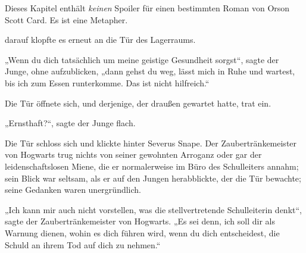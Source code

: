 
\begin{chapterOpeningAuthorNote}
Dieses Kapitel enthält \emph{keinen} Spoiler für einen bestimmten Roman von Orson Scott Card. Es ist eine Metapher.
\end{chapterOpeningAuthorNote}

 darauf klopfte es erneut an die Tür des Lagerraums.

\hplettrineextrapara
„Wenn du dich tatsächlich um meine geistige Gesundheit sorgst“, sagte der Junge, ohne aufzublicken, „dann gehst du weg, lässt mich in Ruhe und wartest, bis ich zum Essen runterkomme. Das ist nicht hilfreich.“

Die Tür öffnete sich, und derjenige, der draußen gewartet hatte, trat ein.

„Ernsthaft?“, sagte der Junge flach.


Die Tür schloss sich und klickte hinter Severus Snape. Der Zaubertränkemeister von Hogwarts trug nichts von seiner gewohnten Arroganz oder gar der leidenschaftslosen Miene, die er normalerweise im Büro des Schulleiters annahm; sein Blick war seltsam, als er auf den Jungen herabblickte, der die Tür bewachte; seine Gedanken waren unergründlich.

„Ich kann mir auch nicht vorstellen, was die stellvertretende Schulleiterin denkt“, sagte der Zaubertränkemeister von Hogwarts. „Es sei denn, ich soll dir als Warnung dienen, wohin es dich führen wird, wenn du dich entscheidest, die Schuld an ihrem Tod auf dich zu nehmen.“

